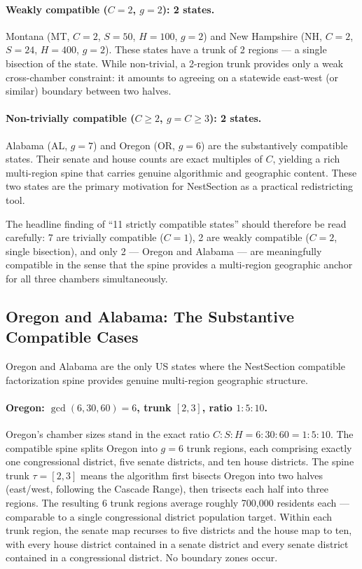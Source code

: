 \paragraph{Weakly compatible ($C = 2$, $g = 2$): 2 states.}
Montana (MT, $C=2$, $S=50$, $H=100$, $g=2$) and New Hampshire
(NH, $C=2$, $S=24$, $H=400$, $g=2$).  These states have a trunk of 2 regions
--- a single bisection of the state.  While non-trivial, a 2-region trunk
provides only a weak cross-chamber constraint: it amounts to agreeing on
a statewide east-west (or similar) boundary between two halves.

\paragraph{Non-trivially compatible ($C \geq 2$, $g = C \geq 3$): 2 states.}
Alabama (AL, $g=7$) and Oregon (OR, $g=6$) are the substantively compatible
states.  Their senate and house counts are exact multiples of $C$, yielding
a rich multi-region spine that carries genuine algorithmic and geographic
content.  These two states are the primary motivation for NestSection as a
practical redistricting tool.

The headline finding of ``11 strictly compatible states'' should therefore be
read carefully: 7 are trivially compatible ($C=1$), 2 are weakly compatible
($C=2$, single bisection), and only 2 --- Oregon and Alabama --- are
meaningfully compatible in the sense that the spine provides a multi-region
geographic anchor for all three chambers simultaneously.

\subsection{Oregon and Alabama: The Substantive Compatible Cases}
\label{subsec:or-al}

Oregon and Alabama are the only US states where the NestSection compatible
factorization spine provides genuine multi-region geographic structure.

\paragraph{Oregon: $\gcd(6, 30, 60) = 6$, trunk $[2,3]$, ratio $1:5:10$.}
Oregon's chamber sizes stand in the exact ratio $C : S : H = 6 : 30 : 60 = 1 : 5 : 10$.
The compatible spine splits Oregon into $g = 6$ trunk regions, each comprising
exactly one congressional district, five senate districts, and ten house
districts.  The spine trunk $\tau = [2, 3]$ means the algorithm first bisects
Oregon into two halves (east/west, following the Cascade Range), then
trisects each half into three regions.  The resulting 6 trunk regions average
roughly 700,000 residents each --- comparable to a single congressional district
population target.  Within each trunk region, the senate map recurses to five
districts and the house map to ten, with every house district contained in a
senate district and every senate district contained in a congressional district.
No boundary zones occur.

